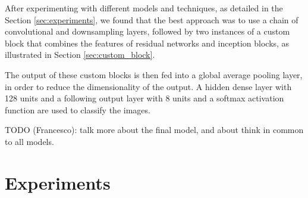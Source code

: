 \documentclass[11pt]{article}
\begin{document}
\begin{multicols}{2}


      After experimenting with different models and techniques, as detailed in
      the Section \ref{sec:experiments}, we found that the best approach was to 
      use a chain of convolutional and downsampling layers, followed by two instances
      of a custom block that combines the features of residual networks and inception 
      blocks, as illustrated in Section \ref{sec:custom_block}.

      The output of these custom blocks is then fed into a global average
      pooling layer, in order to reduce the dimensionality of the output. A
      hidden dense layer with 128 units and a following output layer with 8
      units and a softmax activation function are used to classify the images.

      TODO (Francesco): talk more about the final model, and about think in common to all models.

      \label{sec:experiments}
      \section{Experiments}



\end{multicols}
\end{document}
